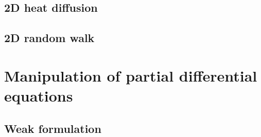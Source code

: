 \subsection{2D heat diffusion}


\subsection{2D random walk}


\section{Manipulation of partial differential equations}

\subsection{Weak formulation}



